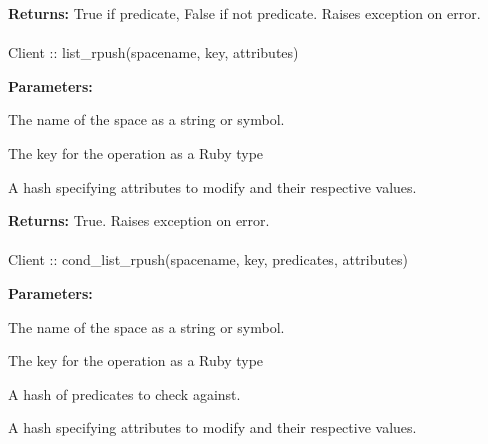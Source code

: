 \noindent\textbf{Returns:}
True if predicate, False if not predicate.  Raises exception on error.

\paragraph{}
\label{api:ruby:list_rpush}
\begin{ccode}
Client :: list_rpush(spacename, key, attributes)
\end{ccode}
\funcdesc 

\noindent\textbf{Parameters:}
\begin{description}[labelindent=\widthof{{\code{attributes}}},leftmargin=*,noitemsep,nolistsep,align=right]
\item[\code{spacename}] The name of the space as a string or symbol.
\item[\code{key}] The key for the operation as a Ruby type
\item[\code{attributes}] A hash specifying attributes to modify and their respective values.
\end{description}

\noindent\textbf{Returns:}
True.  Raises exception on error.

\paragraph{}
\label{api:ruby:cond_list_rpush}
\begin{ccode}
Client :: cond_list_rpush(spacename, key, predicates, attributes)
\end{ccode}
\funcdesc 

\noindent\textbf{Parameters:}
\begin{description}[labelindent=\widthof{{\code{predicates}}},leftmargin=*,noitemsep,nolistsep,align=right]
\item[\code{spacename}] The name of the space as a string or symbol.
\item[\code{key}] The key for the operation as a Ruby type
\item[\code{predicates}] A hash of predicates to check against.
\item[\code{attributes}] A hash specifying attributes to modify and their respective values.
\end{description}

